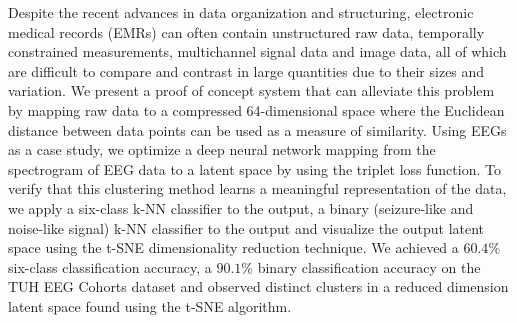 \begin{abstractlong}
		
	Despite the recent advances in data organization and structuring, electronic medical records (EMRs) can often contain unstructured raw data, temporally constrained measurements, multichannel signal data and image data, all of which are difficult to compare and contrast in large quantities due to their sizes and variation. We present a proof of concept system that can alleviate this problem by mapping raw data to a compressed 64-dimensional space where the Euclidean distance between data points can be used as a measure of similarity. Using EEGs as a case study, we optimize a deep neural network mapping from the spectrogram of EEG data to a latent space by using the triplet loss function. To verify that this clustering method learns a meaningful representation of the data, we apply a six-class k-NN classifier to the output, a binary (seizure-like and noise-like signal) k-NN classifier to the output and visualize the output latent space using the t-SNE dimensionality reduction technique. We achieved a $60.4\%$ six-class classification accuracy, a $90.1\%$ binary classification accuracy on the TUH EEG Cohorts dataset and observed distinct clusters in a reduced dimension latent space found using the t-SNE algorithm. 		
\end{abstractlong}